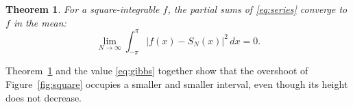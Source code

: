 \documentclass[11pt,a4paper]{article}
\newtheorem{theorem}{Theorem}
\theoremstyle{definition}
\begin{document}
\begin{theorem}\label{thm:mean}
For a square-integrable $f$, the partial sums of \eqref{eq:series}
converge to $f$ in the mean:
\[
  \lim_{N\to\infty}\int_{-\pi}^{\pi}\bigl|f(x)-S_N(x)\bigr|^2\,dx=0.
\]
\end{theorem}

Theorem~\ref{thm:mean} and the value \eqref{eq:gibbs} together show
that the overshoot of Figure~\ref{fig:square} occupies a smaller and
smaller interval, even though its height does not decrease.
\end{document}
